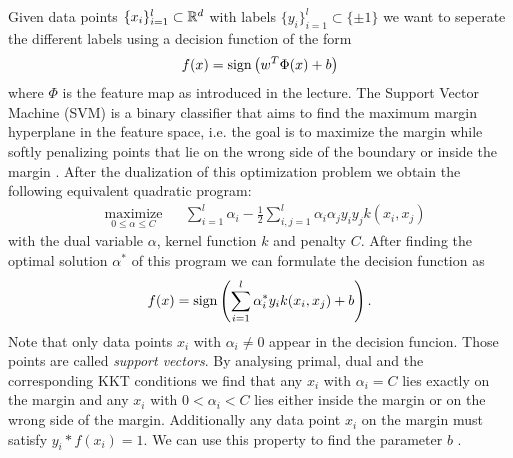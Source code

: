 Given data points $\{x_i\}_{i=1}^l \subset \mathbb{R}^d$ with labels $\{y_i\}_{i=1}^l \subset \{\pm 1\}$ we want to seperate the different labels using a decision function of the form
$$f(x) = \operatorname{sign}\left(w^T\Phi(x) + b\right)$$ where $\Phi$ is the feature map as introduced in the lecture.
The Support Vector Machine (SVM) is a binary classifier that aims to find the maximum margin hyperplane in the feature space, i.e. the goal is to maximize the margin while softly penalizing points that lie on the wrong side of the boundary or inside the margin \cite{Bishop2006}. After the  dualization of this optimization problem we obtain the following equivalent quadratic program:
\begin{equation*}
\begin{aligned}
& \underset{0 \leq \alpha \leq C}{\text{maximize}}
& & \sum_{i = 1}^{l}\alpha_i - \frac{1}{2} \sum_{i, j = 1}^{l}\alpha_i  \alpha_j y_i y_j k(x_i, x_j)
\end{aligned}
\end{equation*}
with the dual variable $\alpha$, kernel function $k$ and penalty $C$.
After finding the optimal solution $\alpha^*$ of this program we can formulate the decision function as
$$f(x) = \operatorname{sign}\left(\sum_{i=1}^{l}\alpha^*_i y_i k(x_i,x_j)+b\right).$$
Note that only data points $x_i$ with $\alpha_i \neq 0$ appear in the decision funcion. Those points are called \textit{support vectors}. By analysing primal, dual and the corresponding KKT conditions we find that any $x_i$ with $\alpha_i = C$ lies exactly on the margin and any $x_i$ with $0<\alpha_i < C$ lies either inside the margin or on the wrong side of the margin. Additionally any data point $x_i$ on the margin must satisfy $y_i*f(x_i) = 1$. We can use this property to find the parameter $b$ \cite{Bishop2006}.